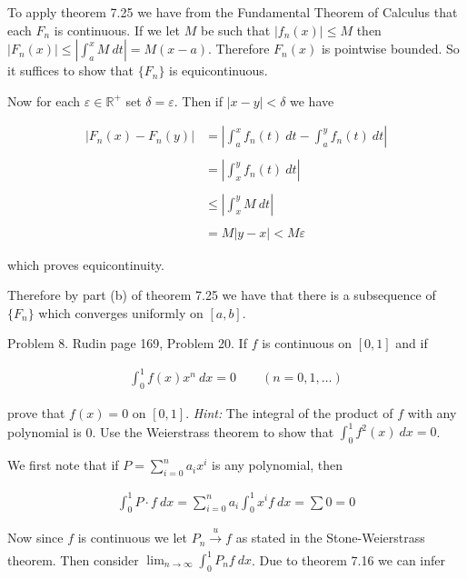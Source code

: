 \documentclass{article}
\begin{document}
  \vspace{1cm} 

  To apply theorem 7.25 we have from the Fundamental Theorem of Calculus that each $F_n$ is continuous.  If we let $M$ be such that $|f_n(x)|\le M$ then $|F_n(x)| \le \left|\int_a^x M \ dt \right| =M(x-a)$.  Therefore $F_n(x)$ is pointwise bounded.  So it suffices to show that $\{F_n\}$ is equicontinuous.  

  Now for each $\varepsilon\in\mathbb R^+$ set $\delta=\varepsilon$.  Then if $|x-y|<\delta$ we have 

  \begin{align*}
    \left|F_n(x)-F_n(y)\right| &= \left|\int_a^x f_n(t)\ dt-\int_a^y f_n(t)\ dt\right| \\\\
    &= \left|\int_x^y f_n(t)\ dt \right| \\\\
    &\le \left|\int_x^y M\ dt \right| \\\\
    &= M|y-x| < M\varepsilon
  \end{align*}

  which proves equicontinuity.  

  Therefore by part (b) of theorem 7.25 we have that there is a subsequence of $\{F_n\}$ which converges uniformly on $[a,b]$.

\pagebreak
  
{\Large \color{Sepia} Problem 8. Rudin page 169, Problem 20. If $f$ is continuous on $[0,1]$ and if 

\begin{align*}
    \int_0^1 f(x) x^n \ dx = 0 \qquad (n=0,1,\dots)
\end{align*}

prove that $f(x)=0$ on $[0,1]$.  {\it Hint:} The integral of the product of $f$ with any polynomial is 0.  Use the Weierstrass theorem to show that $\int_0^1 f^2(x) \ dx = 0$.

}

\vspace{1cm} 

We first note that if $P=\sum_{i=0}^n a_ix^i$ is any polynomial, then 

\begin{align*}
  \int_0^1 P\cdot f \ dx = \sum_{i=0}^n a_i\int_0^1 x^i f \ dx = \sum 0 = 0
\end{align*}

Now since $f$ is continuous we let $P_n\xrightarrow[]{u} f$ as stated in the Stone-Weierstrass theorem.  Then consider $\lim_{n\to \infty}\int_0^1 P_nf \ dx$.  Due to theorem 7.16 we can infer 
\end{document}
